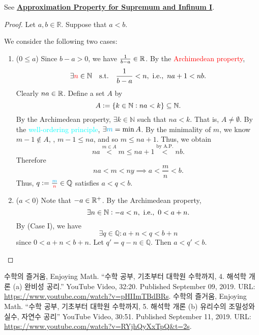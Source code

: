 \documentclass[11pt,openany]{article}
\begin{document}
\begin{remark*}
	See \hyperlink{pro1}{\bf Approximation Property for Supremum and Infinum I}.
\end{remark*}
\vfill
{}
\begin{proof}
Let $a,b\in\mathbb{R}$. Suppose that $a<b$. 
\begin{center}
\end{center} We consider the following two cases: 
\begin{enumerate}
	\item ($0\leq a$) Since $b-a>0$, we have $\frac{1}{b-a}\in\mathbb{R}$. By the \textcolor{red}{Archimedean property}, \[
	\exists \textcolor{red}{n}\in\mathbb{N}\quad \text{s.t.}\quad \frac{1}{b-a}<n,\ \text{\textnormal{i.e.}},\ na+1< nb.
	\] Clearly $na\in\mathbb{R}$. Define a set $A$ by \[
	A:=\set{k\in\mathbb{N}:na<k}\subseteq\mathbb{N}.
	\] By the Archimedean property, $\exists k\in\mathbb{N}$ such that $na<k$. That is, $A\neq\emptyset$. By the \textcolor{cyan}{well-ordering principle}, $\exists \textcolor{cyan}{m}=\min A$. By the minimality of $m$, we know $m-1\notin A$, \ie, $m-1\leq na$, and so $m\leq na+1$. Thus, we obtain \[
	na\overset{m\in A}{<}m\leq na+1\overset{\text{by A.P.}}{<}nb.
	\] Therefore \[
	na<m<ny\implies a<\frac{m}{n}<b.
	\] Thus, $q:=\frac{\textcolor{cyan}{m}}{\textcolor{red}{n}}\in\mathbb{Q}$ satisfies $a<q<b$.
	\item ($a<0$) Note that $-a\in\mathbb{R}^+$. By the Archimedean property, \[
	\exists n\in\mathbb{N}:-a<n,\ \text{\textnormal{i.e.}},\ 0<a+n.
	\] By (Case I), we have \[
	\exists q\in\mathbb{Q}: a+n<q<b+n
	\] since $0<a+n<b+n$. Let $q'=q-n\in\mathbb{Q}$. Then $a<q'<b$.
\end{enumerate}
\end{proof}
\vfill
\begin{thebibliography}{9}
	수학의 즐거움, Enjoying Math. ``수학 공부, 기초부터 대학원 수학까지, 4. 해석학 개론 (a) 완비성 공리.'' YouTube Video, 32:20. Published 
	September 09, 2019. URL: \url{https://www.youtube.com/watch?v=pHIImTBdBRs}.
	수학의 즐거움, Enjoying Math. ``수학 공부, 기초부터 대학원 수학까지, 5. 해석학 개론 (b) 유리수의 조밀성와 실수, 자연수 공리'' YouTube Video, 30:51. Published 
	September 11, 2019. URL: \url{https://www.youtube.com/watch?v=RYjhQyXxTpQ&t=2s}.
\end{thebibliography}
\end{document}
